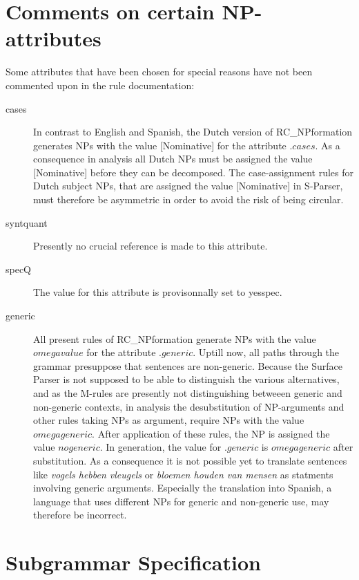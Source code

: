 \section{Comments on certain NP-attributes}

Some attributes 
that have been chosen for special reasons have not been commented upon in the 
rule documentation:

\begin{description}
  \item[cases]\mbox{}
In contrast to English and Spanish, 
the Dutch version of RC\_NPformation generates NPs with the value [Nominative]
for the attribute .$cases$. As a consequence in analysis 
all Dutch NPs must be assigned the 
value [Nominative] before they can be decomposed. The case-assignment rules for 
Dutch subject NPs, that are assigned the value [Nominative] in S-Parser,  must therefore be asymmetric in order to 
avoid the risk of being circular. 
  \item[syntquant]\mbox{}

Presently no crucial reference is made to this attribute.
  \item[specQ]\mbox{}


The value for this attribute is provisonnally set to yesspec.
  \item[generic]\mbox{}

All present rules of RC\_NPformation generate NPs with the value $omegavalue$ 
for the attribute .$generic$. Uptill now, all paths through the grammar 
presuppose that sentences are non-generic. Because the Surface Parser is not 
supposed to be able to distinguish the various alternatives, and as the M-rules 
are presently not distinguishing betweeen generic 
and non-generic contexts,
in analysis the 
desubstitution of NP-arguments and other rules taking NPs as argument, require 
NPs with the value $omegageneric$. After application of these rules, the NP
is assigned the value $nogeneric$. In generation, the value for .$generic$ is 
$omegageneric$ after substitution. As a consequence it is not possible yet to 
translate sentences like {\em vogels hebben vleugels} or {\em bloemen houden 
van mensen} as statments involving generic arguments. Especially the 
translation into Spanish, a language that uses different NPs for generic and 
non-generic use,
may therefore be incorrect. 
\end{description}

\section{Subgrammar Specification}

